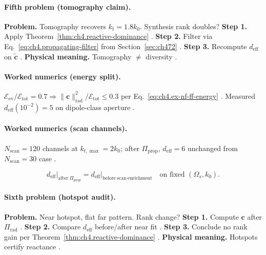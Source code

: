 \paragraph{Fifth problem (tomography claim).}
\textbf{Problem.} Tomography recovers \(k_{t}=1.8k_{0}\). Synthesis rank doubles?
\textbf{Step 1.} Apply Theorem~\ref{thm:ch4.reactive-dominance} \cite{stratton1941,harrington2001,devaney2004}.
\textbf{Step 2.} Filter via Eq.~\eqref{eq:ch4.propagating-filter} from Section~\ref{sec:ch472} \cite{hansen1988,jackson1999}.
\textbf{Step 3.} Recompute \(d_{\mathrm{eff}}\) on \(\widetilde{\mathbf{c}}\) \cite{harrington2001,stratton1941}.
\textbf{Physical meaning.} Tomography \(\neq\) diversity \cite{devaney2004,hansen1988}.

\paragraph{Worked numerics (energy split).}
\(\mathcal{E}_{\mathrm{ev}}/\mathcal{E}_{\mathrm{tot}}=0.7\Rightarrow\|\mathbf{c}\|_{\mathrm{rad}}^{2}/\mathcal{E}_{\mathrm{tot}}\le0.3\) per
Eq.~\eqref{eq:ch4.ex-nf-ff-energy} \cite{stratton1941,jackson1999,harrington2001,devaney2004,hansen1988}. Measured \(d_{\mathrm{eff}}(10^{-2})=5\) on dipole-class
aperture \cite{harrington2001,devaney2004}.

\paragraph{Worked numerics (scan channels).}
\(N_{\mathrm{scan}}=120\) channels at \(k_{t,\max}=2k_{0}\); after \(\Pi_{\mathrm{prop}}\), \(d_{\mathrm{eff}}=6\) unchanged from \(N_{\mathrm{scan}}=30\) case
\cite{harrington2001,stratton1941,hansen1988,devaney2004,jackson1999}.

\begin{equation}
\label{eq:ch4.ex-ev-fraction-rank}
d_{\mathrm{eff}}\big|_{\mathrm{after\ }\Pi_{\mathrm{prop}}}=d_{\mathrm{eff}}\big|_{\mathrm{before\ scan\ enrichment}}
\quad\text{on fixed }(\Omega_{s},k_{0}).
\end{equation}

\paragraph{Sixth problem (hotspot audit).}
\textbf{Problem.} Near hotspot, flat far pattern. Rank change?
\textbf{Step 1.} Compute \(\mathbf{c}\) after \(\Pi_{\mathrm{rad}}\) \cite{stratton1941,harrington2001}.
\textbf{Step 2.} Compare \(d_{\mathrm{eff}}\) before/after near fit \cite{hansen1988,devaney2004}.
\textbf{Step 3.} Conclude no rank gain per Theorem~\ref{thm:ch4.reactive-dominance} \cite{jackson1999,harrington2001}.
\textbf{Physical meaning.} Hotspots certify reactance \cite{stratton1941,devaney2004}.

